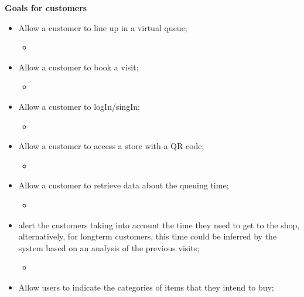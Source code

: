 \textbf{Goals for customers}
\begin{itemize}
    \item Allow a customer to line up in a virtual queue;
        \begin{itemize}
            \item 
        \end{itemize}
    \item Allow a customer to book a visit;
        \begin{itemize}
            \item 
        \end{itemize} 
    \item Allow a customer to logIn/singIn;
        \begin{itemize}
            \item 
        \end{itemize}
    \item Allow a customer to access a store with a QR code;
        \begin{itemize}
            \item 
        \end{itemize}
    \item Allow a customer to retrieve data about the queuing time;
        \begin{itemize}
            \item 
        \end{itemize}
    \item alert the customers taking into account the time they need to get to the shop, alternatively, for longterm customers, this time could be inferred by the system based on an analysis of the previous visits;
        \begin{itemize}
            \item 
        \end{itemize}
    \item Allow users to indicate the categories of items that they intend to buy;
\end{itemize}

